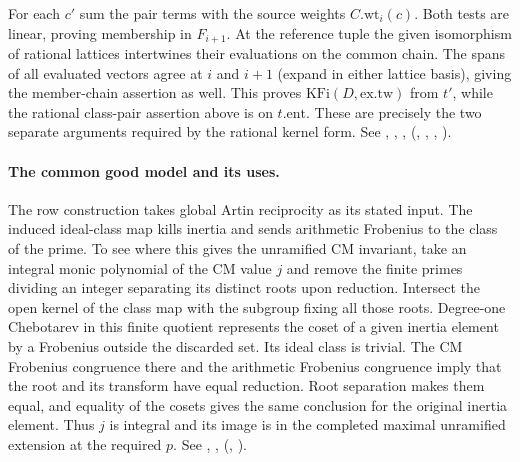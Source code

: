 For each $c'$ sum the pair terms with the source weights $C.\mathrm{wt}_i(c)$.
Both tests are linear, proving membership in $F_{i+1}$.
At the reference tuple the given isomorphism of rational lattices
intertwines their evaluations on the common chain. The spans of all
evaluated vectors agree at $i$ and $i+1$ (expand in either lattice
basis), giving the member-chain assertion as well. This proves
$\mathrm{KFi}(D,\mathrm{ex.tw})$ from $t'$, while the rational class-pair
assertion above is on $t.\mathrm{ent}$. These are precisely the two
separate arguments required by the rational kernel form.
See , , ,
 (,
, ,
).

\paragraph{The common good model and its uses.}
The row construction takes global Artin reciprocity as its stated input.
The induced ideal-class map kills inertia and sends arithmetic
Frobenius to the class of the prime. To see where this gives the
unramified CM invariant, take an integral monic polynomial of the CM
value $j$ and remove the finite primes dividing an integer separating
its distinct roots upon reduction. Intersect the open kernel of the
class map with the subgroup fixing all those roots. Degree-one
Chebotarev in this finite quotient represents the coset of a given
inertia element by a Frobenius outside the discarded set. Its ideal
class is trivial. The CM Frobenius congruence there and the arithmetic
Frobenius congruence imply that the root and its transform have equal
reduction. Root separation makes them equal, and equality of the
cosets gives the same conclusion for the original inertia element.
Thus $j$ is integral and its image is in the completed maximal
unramified extension at the required $p$. See ,
, 
(, ).

